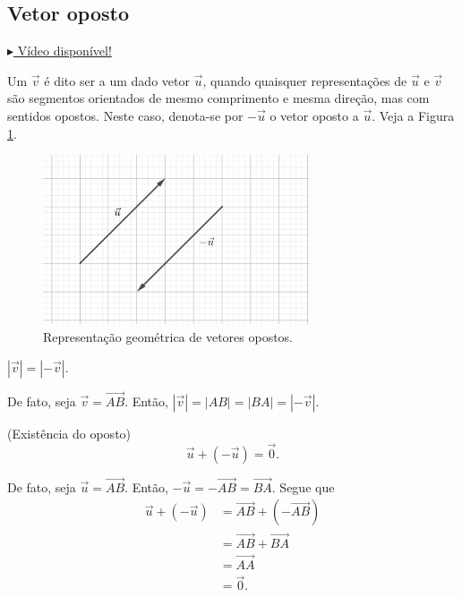 \subsection{Vetor oposto}

\begin{flushright}
  \href{https://archive.org/details/vetor-oposto}{$\blacktriangleright$ Vídeo disponível!}
\end{flushright}

Um  $\vec{v}$ é dito ser   a um dado vetor $\vec{u}$, quando quaisquer representações de $\vec{u}$ e $\vec{v}$ são segmentos orientados de mesmo comprimento e mesma direção, mas com sentidos opostos. Neste caso, denota-se por $-\vec{u}$ o vetor oposto a $\vec{u}$. Veja a Figura \ref{fig:voposto}.

\begin{figure}[H]
  \centering
  \includegraphics[width=0.7\textwidth]{./cap_vetor/dados/fig_voposto/fig_voposto}
  \caption{Representação geométrica de vetores opostos.}
  \label{fig:voposto}
\end{figure}

\begin{obs}
  $|\vec{v}| = |-\vec{v}|$.

  De fato, seja $\vec{v} = \overrightarrow{AB}$. Então, $|\vec{v}| = |AB| = |BA| = |-\vec{v}|$.
\end{obs}

\begin{obs}(Existência do oposto)
  \begin{equation}
    \vec{u} + \left(-\vec{u}\right) = \vec{0}.
  \end{equation}

  De fato, seja $\vec{u} = \overrightarrow{AB}$. Então, $-\vec{u} = -\overrightarrow{AB} = \overrightarrow{BA}$. Segue que
  \begin{align}
    \vec{u} + \left(-\vec{u}\right) &= \overrightarrow{AB} + \left(-\overrightarrow{AB}\right) \\
                                    &= \overrightarrow{AB} + \overrightarrow{BA} \\
                                    &= \overrightarrow{AA} \\
                                    &= \vec{0}.
  \end{align}
\end{obs}

